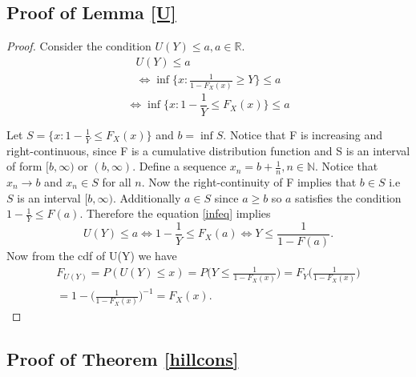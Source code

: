 \documentclass[english,12pt,a4paper,pdftex,sci,utf8]{aaltothesis} %
\begin{document}
\subsection{Proof of Lemma \ref{U}}

\begin{proof}
Consider the condition $U(Y) \leq a, a \in \mathbb{R}$.
\begin{equation*}
\begin{split}
U(Y) \leq a \\
\Leftrightarrow \inf\big\{x: \frac{1}{1-F_X(x)} \geq Y\big\} \leq a
\end{split}
\end{equation*}
\begin{equation}
\Leftrightarrow \inf\big\{x: 1 - \frac{1}{Y} \leq F_X(x)\big\} \leq a
\label{infeq}
\end{equation}


Let $S=\big\{x: 1 - \frac{1}{Y} \leq F_X(x)\big\}$ and $b = \inf S$. Notice that F is increasing and right-continuous, since F is a cumulative distribution function and S is an interval of form $[b,\infty)$ or $(b, \infty)$. Define a sequence $x_n=b+\frac{1}{n}, n\in \mathbb{N}$. Notice that $x_n \rightarrow b$ and $x_n \in S$ for all $n$. Now the right-continuity of F implies that $b \in S$ i.e $S$ is an interval $[b, \infty)$. Additionally $a \in S$ since $a\geq b$ so $a$ satisfies the condition $1-\frac{1}{Y} \leq F(a)$. Therefore the equation \eqref{infeq} implies
\begin{equation*}
U(Y) \leq a \Leftrightarrow 1 - \frac{1}{Y} \leq F_X(a) \Leftrightarrow Y \leq \frac{1}{1-F(a)}.
\end{equation*}
Now from the cdf of U(Y) we have
\begin{equation*}
\begin{split}
F_{U(Y)} = P(U(Y) \leq x) = P\Big(Y \leq \frac{1}{1-F_X(x)}\Big) = F_Y\Big(\frac{1}{1-F_X(x)}\Big) \\
= 1-\Big(\frac{1}{1-F_X(x)}\Big)^{-1} =F_X(x).
\end{split}
\end{equation*}
\end{proof}

\subsection{Proof of Theorem \ref{hillcons}}
\end{document}
